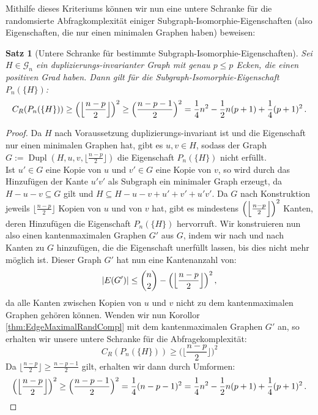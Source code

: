\documentclass[10pt,a4paper]{scrreprt}
\newtheorem{Satz}[definition]{Satz}
\theoremstyle{definition}
\DeclareMathOperator\Dupl{Dupl}
\begin{document}
Mithilfe dieses Kriteriums können wir nun eine
untere Schranke für die randomsierte Abfragkomplexität
einiger Subgraph-Isomorphie-Eigenschaften (also Eigenschaften,
die nur einen minimalen Graphen haben) beweisen:
\begin{Satz}
[Untere Schranke für bestimmte Subgraph-Isomorphie-Eigenschaften]
\label{thm:SubgraphIsomorphismLowerBound}
Sei $H\in \mathcal{G}_n$ ein duplizierungs-invarianter Graph
mit genau $p\leq p$ Ecken, die einen positiven Grad haben.
Dann gilt für die Subgraph-Isomorphie-Eigenschaft $P_n(\{H\})$:
$$ C_R(P_n(\{H\})) \geq 
\Big{ ( } \Big \lfloor  \frac{n-p}{2} \Big \rfloor \Big{)}^{2} \geq
\Big ( \frac{n-p-1}{2} \Big ) ^2 =
\frac{1}{4}n^2 - \frac{1}{2}n(p+1) + \frac{1}{4}(p+1)^2\,.
$$
\end{Satz}
\begin{proof}
Da $H$ nach Voraussetzung duplizierungs-invariant ist und die 
Eigenschaft nur einen minimalen Graphen hat, gibt es
$u,v \in H$, sodass der Graph 
$G:= \Dupl(H, u, v, \big \lfloor \frac{n-p}{2} \big \rfloor)$
die Eigenschaft $P_n(\{H\})$ nicht erfüllt. \\
Ist $u'\in G$ eine Kopie von $u$ und $v' \in G$ eine Kopie von $v$,
so wird durch das Hinzufügen der Kante $u'v'$ als Subgraph ein
minimaler Graph erzeugt, da $H-u-v \subseteq G$ gilt und
$H \subseteq H-u-v + u' + v' + u'v'$. Da $G$ nach Konstruktion
jeweils $\big \lfloor \frac{n-p}{2} \big \rfloor$ Kopien von
$u$ und von $v$ hat, gibt es mindestens
$\Big{ ( } \Big \lfloor  \frac{n-p}{2} \Big \rfloor \Big{)}^{2}$
Kanten, deren Hinzufügen die Eigenschaft $P_n(\{H\})$ hervorruft.
Wir konstruieren nun also einen kantenmaximalen Graphen $G'$ aus
$G$, indem wir nach und nach Kanten zu $G$ hinzufügen, die die
Eigenschaft unerfüllt lassen, bis dies nicht mehr möglich ist.
Dieser Graph $G'$ hat nun eine Kantenanzahl von:
$$ |E(G')| \leq \binom{n}{2} - 
\Big ( \Big \lfloor  \frac{n-p}{2} \Big \rfloor \Big{)}^{2}\,,$$
da alle Kanten zwischen Kopien von $u$ und $v$ nicht zu dem
kantenmaximalen Graphen gehören können. Wenden wir nun
Korollor \ref{thm:EdgeMaximalRandCompl} mit dem kantenmaximalen
Graphen $G'$ an, so erhalten wir unsere untere Schranke für
die Abfragekomplexität:
$$ C_R(P_n(\{H\})) \geq 
\Big (  \Big \lfloor  \frac{n-p}{2} \Big \rfloor \Big )^2$$
Da $\Big \lfloor  \frac{n-p}{2} \Big \rfloor \geq \frac{n-p-1}{2}$
gilt, erhalten wir dann durch Umformen:
\begin{equation*}
\Big ( \Big \lfloor  \frac{n-p}{2} \Big \rfloor \Big{)}^{2} \geq
\Big ( \frac{n-p-1}{2} \Big ) ^2 =
\frac{1}{4}(n-p-1)^2 =
\frac{1}{4}n^2 - \frac{1}{2}n(p+1) + \frac{1}{4}(p+1)^2\,. \qedhere
\end{equation*}
\end{proof}
\end{document}

